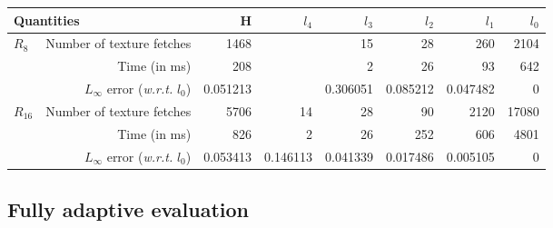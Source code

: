 \documentclass{llncs}
\newcommand{\wrt}{\emph{w.r.t.} }
\begin{document}
\begin{table}
  \begin{center}
	\begin{tabular}{@{}l|rrrrrrr@{}}
	  \toprule
	  \multicolumn{2}{l}{Quantities} & H & $l_4$ & $l_3$ & $l_2$ & $l_1$ & $l_0$\\
	  \midrule
	  \multirow{3}{*}{$R_8$} 
	  	& Number of texture fetches & 1468 &  & 15 & 28 & 260 & 2104\\
	    & Time (in ms) & 208 &   & 2 & 26 & 93 & 642\\
	   	& $L_\infty$ error (\wrt $l_0$) & 0.051213 &   & 0.306051 & 0.085212 & 0.047482 & 0\\
	  \midrule
	  \multirow{3}{*}{$R_{16}$} 
	  	& Number of texture fetches & 5706 & 14 & 28 & 90 & 2120 & 17080 \\
	    & Time (in ms) & 826 & 2 & 26 & 252 & 606 & 4801\\
	  	& $L_\infty$ error (\wrt $l_0$) & 0.053413 & 0.146113 & 0.041339 & 0.017486 & 0.005105 & 0 \\
	 \bottomrule
	\end{tabular}
  \end{center}
\end{table}




\subsection{Fully adaptive evaluation}
\end{document}
